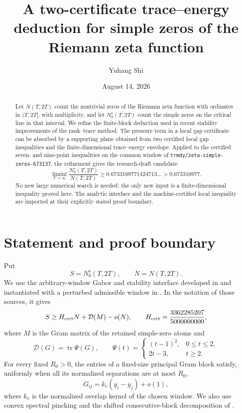 \documentclass[11pt]{amsart}
\title[Two-certificate trace--energy deduction]
{A two-certificate trace--energy deduction for simple zeros of the
Riemann zeta function}
\author{Yuhang Shi}
\date{August 14, 2026}
\theoremstyle{remark}
\DeclareMathOperator{\tr}{tr}
\newcommand{\D}{\mathcal D}
\begin{document}
\begin{abstract}
Let $N(T,2T)$ count the nontrivial zeros of the Riemann zeta function with
ordinates in $(T,2T]$, with multiplicity, and let $N_0^s(T,2T)$ count the
simple zeros on the critical line in that interval.  We refine the
finite-block deduction used in recent stability improvements of the
rank--trace method.  The pressure term in a local gap certificate can be
absorbed by a supporting plane obtained from two certified local gap
inequalities and the finite-dimensional trace--energy envelope.  Applied to
the certified seven- and nine-point inequalities on the common window of
\texttt{trmdy/zeta-simple-zeros-673137}, the refinement gives the
research-draft candidate
\[
 \liminf_{T\to\infty}\frac{N_0^s(T,2T)}{N(T,2T)}
 \ge 0.6733169771424713\ldots>0.673316977.
\]
No new large numerical search is needed: the only new input is a
finite-dimensional inequality proved here.  The analytic interface and the
machine-certified local inequality are imported at their explicitly stated
proof boundary.
\end{abstract}
\maketitle

\section{Statement and proof boundary}

Put
\[
 S=N_0^s(T,2T),\qquad N=N(T,2T).
\]
We use the arbitrary-window Gabor and stability interface developed in
\cite{Claude2026,Ainta2026} and instantiated with a perturbed admissible
window in \cite{Trmdy2026}.  In the notation of those sources, it gives
\begin{equation}\label{eq:interface}
 S\ge H_{\rm cert}N+\D(M)-o(N),
 \qquad
 H_{\rm cert}=\frac{3362285207}{5000000000},
\end{equation}
where $M$ is the Gram matrix of the retained simple-zero atoms and
\[
 \D(G)=\tr\Psi(G),\qquad
 \Psi(t)=
 \begin{cases}
  (t-1)^2,&0\le t\le2,\\
  2t-3,&t\ge2.
 \end{cases}
\]
For every fixed $R_0>0$, the entries of a fixed-size principal Gram block
satisfy, uniformly when all its normalized separations are at most $R_0$,
\begin{equation}\label{eq:gram-limit}
 G_{ij}=k_v(y_i-y_j)+o(1),
\end{equation}
where $k_v$ is the normalized overlap kernel of the chosen window.  We also
use convex spectral pinching and the shifted consecutive-block
decomposition of \cite{Ainta2026,Trmdy2026}.
\end{document}
